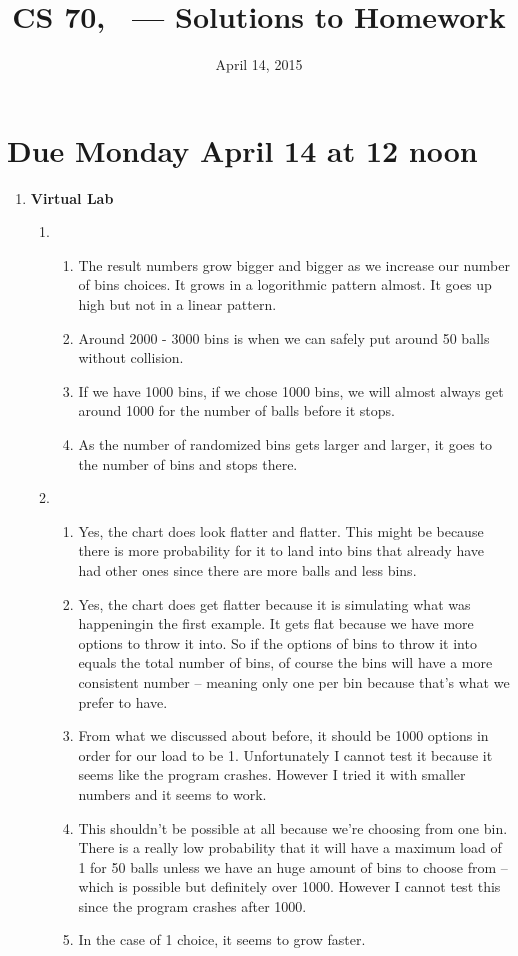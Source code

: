 \documentclass[12pt,fleqn]{article}
\title{CS 70, \Session\ --- Solutions to Homework \Homework}
\date{April 14, 2015}
\begin{document}
\maketitle

\section*{Due Monday April 14 at 12 noon}



\begin{enumerate}
  \item \textbf{Virtual Lab}
 	\begin{enumerate}
 		\item \begin{enumerate}
 			\item The result numbers grow bigger and bigger as we increase our number of bins choices. It grows in a logorithmic pattern almost. It goes up high but not in a linear pattern. 
 			\item Around 2000 - 3000 bins is when we can safely put around 50 balls without collision. 
 			\item If we have 1000 bins, if we chose 1000 bins, we will almost always get around 1000 for the number of balls before it stops.
 			\item As the number of randomized bins gets larger and larger, it goes to the number of bins and stops there. 
 		\end{enumerate}
 		\item \begin{enumerate}
 			\item Yes, the chart does look flatter and flatter. This might be because there is more probability for it to land into bins that already have had other ones since there are more balls and less bins.
 			\item Yes, the chart does get flatter because it is simulating what was happeningin the first example. It gets flat because we have more options to throw it into. So if the options of bins to throw it into equals the total number of bins, of course the bins will have a more consistent number -- meaning only one per bin because that's what we prefer to have. 
 			\item From what we discussed about before, it should be 1000 options in order for our load to be 1. Unfortunately I cannot test it because it seems like the program crashes. However I tried it with smaller numbers and it seems to work.
 			\item This shouldn't be possible at all because we're choosing from one bin. There is a really low probability that it will have a maximum load of 1 for 50 balls unless we have an huge amount of bins to choose from -- which is possible but definitely over 1000. However I cannot test this since the program crashes after 1000.
 			\item In the case of 1 choice, it seems to grow faster. 
 		\end{enumerate}
 	\end{enumerate}
  

\end{enumerate}
\end{document}
